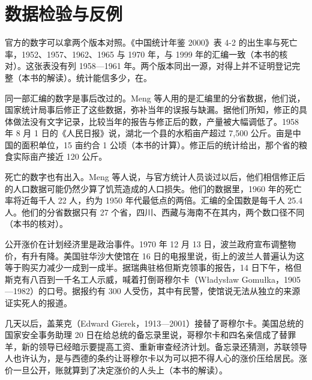 \section{数据检验与反例}\label{sec:planned-data}

官方的数字可以拿两个版本对照。《中国统计年鉴 2000》表 4-2 的出生率与死亡率，1952、1957、1962、1965 与 1970 年，与 1999 年的汇编一致（本书的核对）\cite{nbs2000,nbs1999}。这张表没有列 1958—1961 年。两个版本同出一源，对得上并不证明登记完整（本书的解读）。统计能信多少，在。

同一部汇编的数字是事后改过的。Meng 等人用的是汇编里的分省数据，他们说，国家统计局事后修正了这些数据，弥补当年的误报与缺漏\cite{mqy2010}。据他们所知，修正的具体做法没有文字记录，比较当年的报告与修正后的数，产量被大幅调低了\cite{mqy2010}。1958 年 8 月 1 日的《人民日报》说，湖北一个县的水稻亩产超过 7,500 公斤\cite{mqy2010}。亩是中国的面积单位，15 亩约合 1 公顷（本书的计算）。修正后的统计给出，那个省的粮食实际亩产接近 120 公斤\cite{mqy2010}。

死亡的数字也有出入。Meng 等人说，与官方统计人员谈过以后，他们相信修正后的人口数据可能仍然少算了饥荒造成的人口损失\cite{mqy2010}。他们的数据里，1960 年的死亡率将近每千人 22 人，约为 1950 年代最低点的两倍\cite{mqy2010}。汇编的全国数是每千人 25.4 人。他们的分省数据只有 27 个省，四川、西藏与海南不在其内，两个数口径不同（本书的核对）\cite{mqy2010,nbs1999}。

公开涨价在计划经济里是政治事件。1970 年 12 月 13 日，波兰政府宣布调整物价，有升有降\cite{frus1970}。美国驻华沙大使馆在 16 日的电报里说，街上的波兰人普遍认为这等于购买力减少一成到一成半\cite{frus1970}。据瑞典驻格但斯克领事的报告，14 日下午，格但斯克有八百到一千名工人示威，喊着打倒哥穆尔卡（Władysław Gomułka，1905—1982）的口号\cite{frus1970,loc43}。据报约有 300 人受伤，其中有民警，使馆说无法从独立的来源证实死人的报道\cite{frus1970}。

几天以后，盖莱克（Edward Gierek，1913—2001）接替了哥穆尔卡\cite{frus1970,loc43}。美国总统的国家安全事务助理 20 日在给总统的备忘录里说，哥穆尔卡和四名亲信成了替罪羊，新的领导已经暗示要提高工资、重新审查经济计划\cite{frus1970}。备忘录还猜测，苏联领导人也许认为，是与西德的条约让哥穆尔卡以为可以把不得人心的涨价压给居民\cite{frus1970}。涨价一旦公开，账就算到了决定涨价的人头上（本书的解读）。


